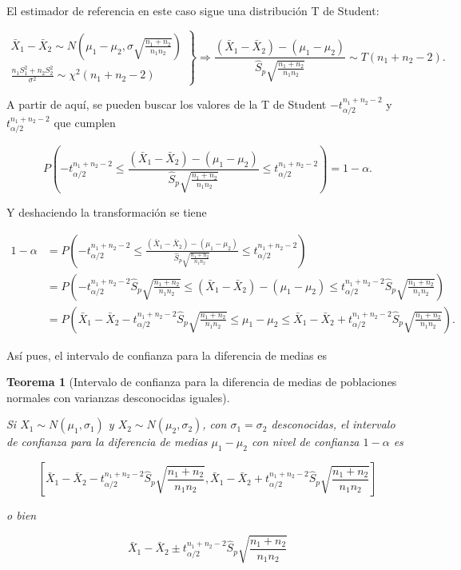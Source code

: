 \documentclass[
  a4paper,
]{scrreport}
\theoremstyle{plain}
\newtheorem{theorem}{Teorema}[chapter]
\theoremstyle{definition}
\theoremstyle{definition}
\theoremstyle{remark}
\begin{document}
El estimador de referencia en este caso sigue una distribución T de
Student:

\[
\left.
\begin{array}{l}
\bar{X}_1-\bar{X}_2\sim N\left(\mu_1-\mu_2,\sigma\sqrt{\frac{n_1+n_2}{n_1n_2}} \right)\\
\displaystyle \frac{n_1S_1^2+n_2S_2^2}{\sigma^2} \sim \chi^2(n_1+n_2-2)
\end{array}
\right\}
\Rightarrow
\frac{(\bar{X}_1-\bar{X}_2)-(\mu_1-\mu_2)}{\hat{S}_p\sqrt{\frac{n_1+n_2}{n_1n_2}}} \sim T(n_1+n_2-2).
\]

A partir de aquí, se pueden buscar los valores de la T de Student
\(-t^{n_1+n_2-2}_{\alpha/2}\) y \(t^{n_1+n_2-2}_{\alpha/2}\) que cumplen

\[
P\left(-t^{n_1+n_2-2}_{\alpha/2}\leq \frac{(\bar{X}_1-\bar{X}_2)-(\mu_1-\mu_2)}{\hat{S}_p\sqrt{\frac{n_1+n_2}{n_1n_2}}}
\leq t^{n_1+n_2-2}_{\alpha/2}\right) = 1-\alpha.
\]

Y deshaciendo la transformación se tiene

\begin{align*}
1-\alpha 
&= P\left(-t^{n_1+n_2-2}_{\alpha/2}\leq \frac{(\bar{X}_1-\bar{X}_2)-(\mu_1-\mu_2)}{\hat{S}_p\sqrt{\frac{n_1+n_2}{n_1n_2}}} \leq t^{n_1+n_2-2}_{\alpha/2}\right) \\
&= P\left(-t^{n_1+n_2-2}_{\alpha/2}\hat{S}_p\sqrt{\frac{n_1+n_2}{n_1n_2}}\leq (\bar{X}_1-\bar{X}_2)-(\mu_1-\mu_2) \leq t^{n_1+n_2-2}_{\alpha/2}\hat{S}_p\sqrt{\frac{n_1+n_2}{n_1n_2}}\right) \\
&= P\left(\bar{X}_1-\bar{X}_2 - t^{n_1+n_2-2}_{\alpha/2}\hat{S}_p\sqrt{\frac{n_1+n_2}{n_1n_2}}\leq \mu_1-\mu_2 \leq \bar{X}_1-\bar{X}_2 + t^{n_1+n_2-2}_{\alpha/2}\hat{S}_p\sqrt{\frac{n_1+n_2}{n_1n_2}}\right).
\end{align*}

Así pues, el intervalo de confianza para la diferencia de medias es

\begin{theorem}[Intervalo de confianza para la diferencia de medias de
poblaciones normales con varianzas desconocidas
iguales]\protect\hypertarget{thm-intervalo-confianza-diferencia-medias-normales-varianzas-desconocidas-iguales}{}\label{thm-intervalo-confianza-diferencia-medias-normales-varianzas-desconocidas-iguales}

Si \(X_1\sim N(\mu_1,\sigma_1)\) y \(X_2\sim N(\mu_2,\sigma_2)\), con
\(\sigma_1 = \sigma_2\) desconocidas, el \emph{intervalo de confianza
para la diferencia de medias} \(\mu_1-\mu_2\) con nivel de confianza
\(1-\alpha\) es

\[
\left[\bar{X}_1-\bar{X}_2-t^{n_1+n_2-2}_{\alpha/2}\hat{S}_p\sqrt{\frac{n_1+n_2}{n_1n_2}},\bar{X}_1-\bar{X}_2+t^{n_1+n_2-2}_{\alpha/2}\hat{S}_p\sqrt{\frac{n_1+n_2}{n_1n_2}}\right]
\]

o bien

\[
\bar{X}_1-\bar{X}_2\pm t^{n_1+n_2-2}_{\alpha/2}\hat{S}_p\sqrt{\frac{n_1+n_2}{n_1n_2}}
\]

\end{theorem}
\end{document}
